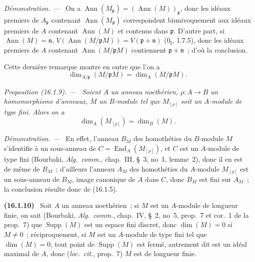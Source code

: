 \documentclass[10pt,oneside]{book}
\makeatletter
\newcommand{\setmanualcurrentlabel}[1]{\def\@currentlabel{#1}}
\newenvironment{env}[1][]{\setmanualcurrentlabel{#1}\par\medskip\noindent\textbf{(#1)}\ }{\par}
\newenvironment{proposition}[1][]{%
  \setmanualcurrentlabel{#1}\par\medskip\noindent\itshape Proposition (#1). ---\ }{\par}
\newenvironment{proof}{%
  \par\medskip\noindent\textit{Démonstration. ---\ }}{\par}
\makeatother
\begin{document}
\begin{proof}
On a
$\operatorname{Ann}(M_{\mathfrak{p}})=(\operatorname{Ann}(M))_{\mathfrak{p}}$,
donc les idéaux premiers de $A_{\mathfrak{p}}$ contenant
$\operatorname{Ann}(M_{\mathfrak{p}})$ correspondent biunivoquement aux
idéaux premiers de $A$ contenant $\operatorname{Ann}(M)$ et contenus dans
$\mathfrak{p}$. D'autre part, si $\operatorname{Ann}(M)=\mathfrak{n}$,
$V(\operatorname{Ann}(M/\mathfrak{p}M))=V(\mathfrak{p}+\mathfrak{n})$
($0_{\mathrm I}$, 1.7.5), donc les idéaux premiers de $A$ contenant
$\operatorname{Ann}(M/\mathfrak{p}M)$ contiennent
$\mathfrak{p}+\mathfrak{n}$~; d'où la conclusion.

Cette dernière remarque montre en outre que l'on a
\[
\label{0.16.1.8.2-fr}
  \dim_{A/\mathfrak{p}}(M/\mathfrak{p}M)=\dim_A(M/\mathfrak{p}M).
\tag{16.1.8.2}
\]
\end{proof}

\begin{proposition}[16.1.9]
\label{0.16.1.9-fr}
Soient $A$ un anneau noethérien, $\rho:A\to B$ un homomorphisme d'anneaux,
$M$ un $B$-module tel que $M_{[\rho]}$ soit un $A$-module de type fini. Alors
on a
\[
\label{0.16.1.9.1-fr}
  \dim_A(M_{[\rho]})=\dim_B(M).
\tag{16.1.9.1}
\]
\end{proposition}

\begin{proof}
En effet, l'anneau $B_M$ des homothéties du $B$-module $M$ s'identifie à un
sous-anneau de $C=\operatorname{End}_A(M_{[\rho]})$, et $C$ est un $A$-module
de type fini (Bourbaki, \emph{Alg.~comm.}, chap.~III, \S~3, no~1, lemme~2),
donc il en est de même de $B_M$~; d'ailleurs l'anneau $A_M$ des homothéties du
$A$-module $M_{[\rho]}$ est un sous-anneau de $B_M$, image canonique de $A$
dans $C$, donc $B_M$ est fini sur $A_M$~; la conclusion résulte donc de
(16.1.5).
\end{proof}

\begin{env}[16.1.10]
\label{0.16.1.10-fr}
Soit $A$ un anneau noethérien~; si $M$ est un $A$-module de longueur finie, on
sait (Bourbaki, \emph{Alg.~comm.}, chap.~IV, \S~2, no~5, prop.~7 et cor.~1 de
la prop.~7) que $\operatorname{Supp}(M)$ est un espace fini discret, donc
$\dim(M)=0$ si $M\neq0$~; réciproquement, si $M$ est un $A$-module de type
fini tel que $\dim(M)=0$, tout point de $\operatorname{Supp}(M)$ est fermé,
autrement dit est un idéal maximal de $A$, donc (\emph{loc.~cit.}, prop.~7)
$M$ est de longueur finie.
\end{env}
\end{document}
